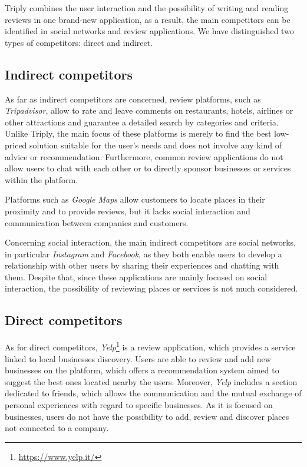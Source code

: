 \documentclass[letterpaper, 11pt]{Proposal}
\begin{document}
Triply combines the user interaction and the possibility of writing and reading reviews in one brand-new application, as a result, the main competitors can be identified in social networks and review applications.
We have distinguished two types of competitors: direct and indirect. 

\subsection{Indirect competitors}
As far as indirect competitors are concerned, review platforms, such as \emph{Tripadvisor}, allow to rate and leave comments on restaurants, hotels, airlines or other attractions and guarantee a detailed search by categories and criteria. Unlike Triply, the main focus of these platforms is merely to find the best low-priced solution suitable for the user’s needs and does not involve any kind of advice or recommendation. Furthermore, common review applications do not allow users to chat with each other or to directly sponsor businesses or services within the platform. 

Platforms such as \emph{Google Maps} allow customers to locate places in their proximity and to provide reviews, but it lacks social interaction and communication between companies and customers.

Concerning social interaction, the main indirect competitors are social networks, in particular \emph{Instagram} and \emph{Facebook}, as they both enable users to develop a relationship with other users by sharing their experiences and chatting with them. Despite that, since these applications are mainly focused on social interaction, the possibility of reviewing places or services is not much considered.

\subsection{Direct competitors}
As for direct competitors, \emph{Yelp}\footnote{\url{https://www.yelp.it/}} is a review application, which provides a service linked to local businesses discovery. Users are able to review and add new businesses on the platform, which offers a recommendation system aimed to suggest the best ones located nearby the users.
Moreover, \emph{Yelp} includes a section dedicated to friends, which allows the communication and the mutual exchange of personal experiences with regard to specific businesses. 
As it is focused on businesses, users do not have the possibility to add, review and discover places not connected to a company.
\end{document}
